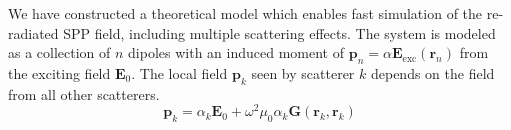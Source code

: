 We have constructed a theoretical model which enables fast simulation of
the re-radiated SPP field, including multiple scattering effects. The
system is modeled as a collection of $n$ dipoles with an induced moment of
$\mathbf{p}_n=\alpha \mathbf{E}_\mathrm{exc}(\mathbf{r}_n)$
from the exciting field $\mathbf{E}_0$. The local field $\mathbf{p}_k$ seen by
scatterer $k$ depends on the field from all other scatterers.
\begin{equation}
\mathbf{p}_k = \alpha_k \mathbf{E}_0 + \omega^2 \mu_0 \alpha_k
\mathbf{G}(\mathbf{r}_k,\mathbf{r}_k)
\label{eqn:foremandipole}
\end{equation}
